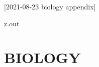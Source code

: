 [2021-08-23 biology appendix]

\begin{VerbatimOut}{z.out}
\chapter{BIOLOGY}

\end{VerbatimOut}

\MyIO
